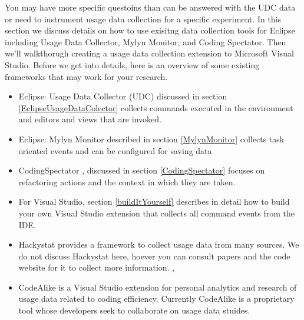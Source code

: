 You may have more specific questoins than can be answered with the UDC data or need to instrument usage data collection for a specific experiment.  In this section we discuss details on how to use exisitng data collection tools for Eclipse including Usage Data Collector, Mylyn Monitor, and Coding Spectator.  Then we'll walkthorugh creating a usage data collection extension to Microsoft Visual Studio.  Before we get into details, here is an overview of some existing frameworks that may work for your research.

\begin{itemize}

	\item Eclipse: Usage Data Collector (UDC) discussed in section \ref{EclipseUsageDataColector} collects commands executed in the environment and editors and views that are invoked.
	
	\item Eclipse: Mylyn Monitor described in section \ref{MylynMonitor} collects task oriented events and can be configured for saving data
	
	\item CodingSpectator %
, discussed in section \ref{CodingSpectator} focuses on refactoring actions and the context in which they are taken.
	
	\item For Visual Studio, section \ref{buildItYourself} describes in detail how to build your own Visual Studio extension that collects all command events from the IDE.
	
	\item Hackystat provides a framework to collect usage data from many sources.  We do not discuss Hackystat here, hoever you can consult papers and the code website for it to collect more information. \cite{V:johnson2003beyond}, %
	
	\item CodeAlike is a Visual Studio extension for personal analytics and research of usage data related to coding efficiency.  Currently CodeAlike is a proprietary tool whose developers seek to collaborate on usage data stuides.

\end{itemize}


